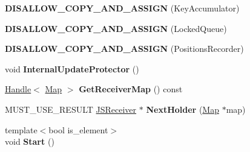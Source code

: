 \begin{DoxyCompactItemize}
\item 
{\bfseries D\+I\+S\+A\+L\+L\+O\+W\+\_\+\+C\+O\+P\+Y\+\_\+\+A\+N\+D\+\_\+\+A\+S\+S\+I\+GN} (Key\+Accumulator)\hypertarget{classv8_1_1internal_1_1_b_a_s_e___e_m_b_e_d_d_e_d_a03a46db9bcc1052b60cb57d2132f9e85}{}\label{classv8_1_1internal_1_1_b_a_s_e___e_m_b_e_d_d_e_d_a03a46db9bcc1052b60cb57d2132f9e85}

\item 
{\bfseries D\+I\+S\+A\+L\+L\+O\+W\+\_\+\+C\+O\+P\+Y\+\_\+\+A\+N\+D\+\_\+\+A\+S\+S\+I\+GN} (Locked\+Queue)\hypertarget{classv8_1_1internal_1_1_b_a_s_e___e_m_b_e_d_d_e_d_ac70ecaec021a97c8593340c08b01193e}{}\label{classv8_1_1internal_1_1_b_a_s_e___e_m_b_e_d_d_e_d_ac70ecaec021a97c8593340c08b01193e}

\item 
{\bfseries D\+I\+S\+A\+L\+L\+O\+W\+\_\+\+C\+O\+P\+Y\+\_\+\+A\+N\+D\+\_\+\+A\+S\+S\+I\+GN} (Positions\+Recorder)\hypertarget{classv8_1_1internal_1_1_b_a_s_e___e_m_b_e_d_d_e_d_a2af760832f0a8b32568515546282b607}{}\label{classv8_1_1internal_1_1_b_a_s_e___e_m_b_e_d_d_e_d_a2af760832f0a8b32568515546282b607}

\item 
void {\bfseries Internal\+Update\+Protector} ()\hypertarget{classv8_1_1internal_1_1_b_a_s_e___e_m_b_e_d_d_e_d_a5d553b1fd9c00c025c5d1d92c31152d0}{}\label{classv8_1_1internal_1_1_b_a_s_e___e_m_b_e_d_d_e_d_a5d553b1fd9c00c025c5d1d92c31152d0}

\item 
\hyperlink{classv8_1_1internal_1_1_handle}{Handle}$<$ \hyperlink{classv8_1_1internal_1_1_map}{Map} $>$ {\bfseries Get\+Receiver\+Map} () const \hypertarget{classv8_1_1internal_1_1_b_a_s_e___e_m_b_e_d_d_e_d_a43dcc7fd01e59d18c82b8510da8dcc2f}{}\label{classv8_1_1internal_1_1_b_a_s_e___e_m_b_e_d_d_e_d_a43dcc7fd01e59d18c82b8510da8dcc2f}

\item 
M\+U\+S\+T\+\_\+\+U\+S\+E\+\_\+\+R\+E\+S\+U\+LT \hyperlink{classv8_1_1internal_1_1_j_s_receiver}{J\+S\+Receiver} $\ast$ {\bfseries Next\+Holder} (\hyperlink{classv8_1_1internal_1_1_map}{Map} $\ast$map)\hypertarget{classv8_1_1internal_1_1_b_a_s_e___e_m_b_e_d_d_e_d_af2758e06fa131df27a93af3ba197a6cd}{}\label{classv8_1_1internal_1_1_b_a_s_e___e_m_b_e_d_d_e_d_af2758e06fa131df27a93af3ba197a6cd}

\item 
{\footnotesize template$<$bool is\+\_\+element$>$ }\\void {\bfseries Start} ()\hypertarget{classv8_1_1internal_1_1_b_a_s_e___e_m_b_e_d_d_e_d_aa6ed2e33266b0171c1a4f17c39a807b6}{}\label{classv8_1_1internal_1_1_b_a_s_e___e_m_b_e_d_d_e_d_aa6ed2e33266b0171c1a4f17c39a807b6}


\end{DoxyCompactItemize}
